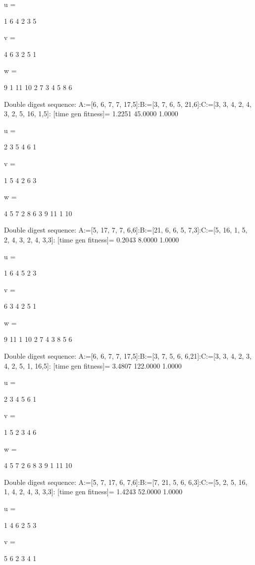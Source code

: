 u =

     1     6     4     2     3     5


v =

     4     6     3     2     5     1


w =

     9     1    11    10     2     7     3     4     5     8     6

Double digest sequence:
A:=[6, 6, 7, 7, 17,5]:B:=[3, 7, 6, 5, 21,6]:C:=[3, 3, 4, 2, 4, 3, 2, 5, 16, 1,5]:
[time gen fitness]=
    1.2251   45.0000    1.0000


u =

     2     3     5     4     6     1


v =

     1     5     4     2     6     3


w =

     4     5     7     2     8     6     3     9    11     1    10

Double digest sequence:
A:=[5, 17, 7, 7, 6,6]:B:=[21, 6, 6, 5, 7,3]:C:=[5, 16, 1, 5, 2, 4, 3, 2, 4, 3,3]:
[time gen fitness]=
    0.2043    8.0000    1.0000


u =

     1     6     4     5     2     3


v =

     6     3     4     2     5     1


w =

     9    11     1    10     2     7     4     3     8     5     6

Double digest sequence:
A:=[6, 6, 7, 7, 17,5]:B:=[3, 7, 5, 6, 6,21]:C:=[3, 3, 4, 2, 3, 4, 2, 5, 1, 16,5]:
[time gen fitness]=
    3.4807  122.0000    1.0000


u =

     2     3     4     5     6     1


v =

     1     5     2     3     4     6


w =

     4     5     7     2     6     8     3     9     1    11    10

Double digest sequence:
A:=[5, 7, 17, 6, 7,6]:B:=[7, 21, 5, 6, 6,3]:C:=[5, 2, 5, 16, 1, 4, 2, 4, 3, 3,3]:
[time gen fitness]=
    1.4243   52.0000    1.0000


u =

     1     4     6     2     5     3


v =

     5     6     2     3     4     1



